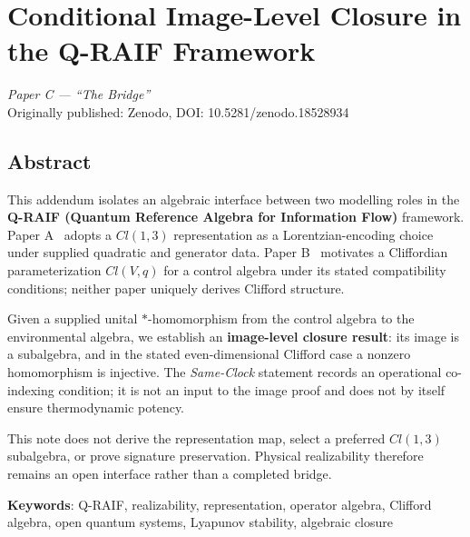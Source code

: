 \documentclass[12pt,a4paper,openany]{book}
\begin{document}

\chapter{Conditional Image-Level Closure in the Q-RAIF Framework}
\label{Q-chap:paperC}

\begin{center}
\textit{Paper C --- ``The Bridge''}\\[0.5em]
Originally published: Zenodo, DOI: 10.5281/zenodo.18528934
\end{center}

\bigskip

\section*{Abstract}
This addendum isolates an algebraic interface between two modelling roles in the \textbf{Q-RAIF (Quantum Reference Algebra for Information Flow)} framework.
Paper A~\cite{Liu2026QRAIF_A} adopts a $Cl(1,3)$ representation as a Lorentzian-encoding choice under supplied quadratic and generator data.
Paper B~\cite{Liu2026QRAIF_B} motivates a Cliffordian parameterization $Cl(V,q)$ for a control algebra under its stated compatibility conditions; neither paper uniquely derives Clifford structure.

Given a supplied unital $*$-homomorphism from the control algebra to the environmental algebra, we establish an \textbf{image-level closure result}: its image is a subalgebra, and in the stated even-dimensional Clifford case a nonzero homomorphism is injective.
The \emph{Same-Clock} statement records an operational co-indexing condition; it is not an input to the image proof and does not by itself ensure thermodynamic potency.

This note does not derive the representation map, select a preferred $Cl(1,3)$ subalgebra, or prove signature preservation.  Physical realizability therefore remains an open interface rather than a completed bridge.

\medskip
\noindent\textbf{Keywords}: Q-RAIF, realizability, representation, operator algebra, Clifford algebra, open quantum systems, Lyapunov stability, algebraic closure


\end{document}
